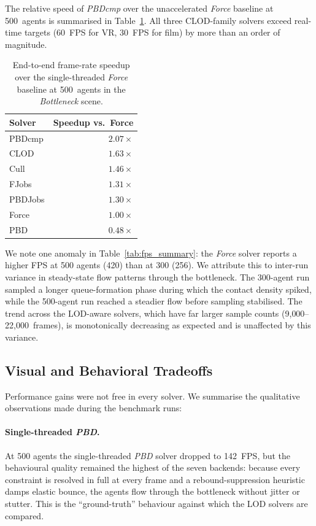 The relative speed of \textit{PBDcmp} over the unaccelerated
\textit{Force} baseline at 500~agents is summarised in
Table~\ref{tab:speedup}.  All three CLOD-family solvers exceed
real-time targets (60~FPS for VR, 30~FPS for film) by more than an
order of magnitude.

\begin{table}[h]
\centering
\small
\begin{tabular}{lr}
\hline
\textbf{Solver} & \textbf{Speedup vs.\ Force} \\
\hline
PBDcmp        & $\mathbf{2.07\times}$ \\
CLOD          & $1.63\times$          \\
Cull          & $1.46\times$          \\
FJobs         & $1.31\times$          \\
PBDJobs       & $1.30\times$          \\
Force         & $1.00\times$          \\
PBD           & $0.48\times$          \\
\hline
\end{tabular}
\caption{End-to-end frame-rate speedup over the single-threaded
\textit{Force} baseline at 500~agents in the \textit{Bottleneck}
scene.}
\label{tab:speedup}
\end{table}

We note one anomaly in Table~\ref{tab:fps_summary}: the \textit{Force}
solver reports a higher FPS at 500 agents (420) than at 300 (256).
We attribute this to inter-run variance in steady-state flow patterns
through the bottleneck.  The 300-agent run sampled a longer
queue-formation phase during which the contact density spiked, while
the 500-agent run reached a steadier flow before sampling stabilised.
The trend across the LOD-aware solvers, which have far larger sample
counts (9{,}000--22{,}000~frames), is monotonically decreasing as
expected and is unaffected by this variance.

\subsection{Visual and Behavioral Tradeoffs}
\label{sec:results_visual}

Performance gains were not free in every solver.  We summarise the
qualitative observations made during the benchmark runs:

\paragraph{Single-threaded \textit{PBD}.}  At 500 agents the
single-threaded \textit{PBD} solver dropped to 142~FPS, but the
behavioural quality remained the highest of the seven backends:
because every constraint is resolved in full at every frame and a
rebound-suppression heuristic damps elastic bounce, the agents flow
through the bottleneck without jitter or stutter.  This is the
``ground-truth'' behaviour against which the LOD solvers are compared.

